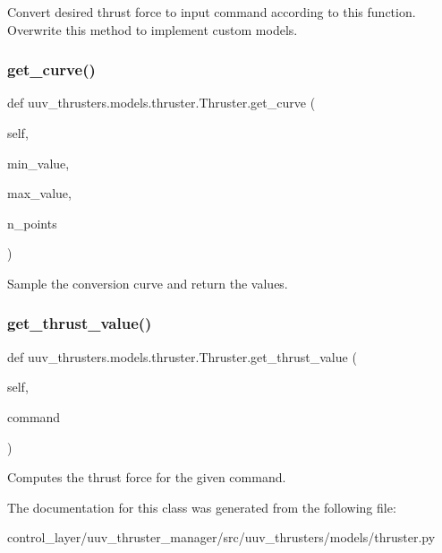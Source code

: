 \begin{DoxyVerb}Convert desired thrust force to input command according to this
function. Overwrite this method to implement custom models.\end{DoxyVerb}
 \mbox{\label{classuuv__thrusters_1_1models_1_1thruster_1_1Thruster_a82e413f504f341cbee6b200906045b30}} 
\subsubsection{\texorpdfstring{get\+\_\+curve()}{get\_curve()}}
{\footnotesize\ttfamily def uuv\+\_\+thrusters.\+models.\+thruster.\+Thruster.\+get\+\_\+curve (\begin{DoxyParamCaption}\item[{}]{self,  }\item[{}]{min\+\_\+value,  }\item[{}]{max\+\_\+value,  }\item[{}]{n\+\_\+points }\end{DoxyParamCaption})}

\begin{DoxyVerb}Sample the conversion curve and return the values.\end{DoxyVerb}
 \mbox{\label{classuuv__thrusters_1_1models_1_1thruster_1_1Thruster_a8ac586d53fe484de470043b23bd9eded}} 
\subsubsection{\texorpdfstring{get\+\_\+thrust\+\_\+value()}{get\_thrust\_value()}}
{\footnotesize\ttfamily def uuv\+\_\+thrusters.\+models.\+thruster.\+Thruster.\+get\+\_\+thrust\+\_\+value (\begin{DoxyParamCaption}\item[{}]{self,  }\item[{}]{command }\end{DoxyParamCaption})}

\begin{DoxyVerb}Computes the thrust force for the given command.\end{DoxyVerb}
 

The documentation for this class was generated from the following file\+:\begin{DoxyCompactItemize}
\item 
control\+\_\+layer/uuv\+\_\+thruster\+\_\+manager/src/uuv\+\_\+thrusters/models/thruster.\+py\end{DoxyCompactItemize}

